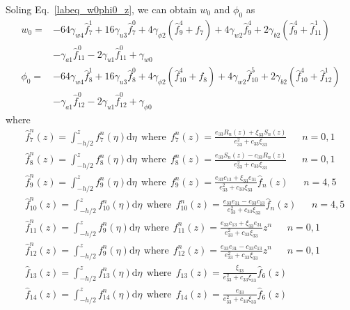 \documentclass[12pt,sort&compress,fleqn,3p]{elsarticle}
\begin{document}
Soling Eq.~\eqref{labeq_w0phi0_z}, we can obtain  $w_{0}$ and $\phi_{0}$  as
\begin{equation}\label{labeq_w0phi0}
\begin{split}
w_{0}=&-64\gamma_{w4}\hat{f}^1_{7}+16\gamma_{u3}\hat{f}^0_{7}+ 4 \gamma_{\phi 2} (\hat{f}^4_{9}+ f_7)  +4 \gamma_{w 2} \hat{f}^4_{9} +  2 \gamma_{b2}(\hat{f}^4_{9} + \hat{f}^1_{11}) \\
 &-  \gamma_{a1} \hat{f}^0_{11} - 2\gamma_{u1}\hat{f}^0_{11}   +  \gamma_{w0}  \\
\phi_{0}= & -64\gamma_{w4}\hat{f}^1_{8}+16\gamma_{u3}\hat{f}^0_{8}+4 \gamma_{\phi 2}( \hat{f}^4_{10} +f_8) +4 \gamma_{w 2} \hat{f}^5_{10} + 2 \gamma_{b2}(\hat{f}^4_{10} + \hat{f}^1_{12}) \\
&-  \gamma_{a1}\hat{f}^0_{12} - 2\gamma_{u1}\hat{f}^0_{12} +\gamma_{\phi0}
\end{split}
\end{equation}
where
\begin{equation}
\begin{split}
&\hat{f}^n_{7}(z)=\int_{-h/2}^{z} f^n_{7}(\eta) \mathrm{d}\eta     ~~\text{where}~~  f^n_{7}(z) =  \frac{e_{33}R_{n}(z)+\xi_{33}S_{n}(z)}{e_{33}^{2}+c_{33}\xi_{33}}  ~~~~~~~n=0,1  \\
&\hat{f}^n_{8}(z)=\int_{-h/2}^{z} f^n_{8}(\eta) \mathrm{d}\eta  ~~\text{where}~~  f^n_{8}(z) = \frac{e_{33}S_{n}(z)-c_{33}R_{n}(z)}{e_{33}^{2}+c_{33}\xi_{33}}  ~~~~~~~n=0,1 \\
&\hat{f}^n_{9}(z)=\int_{-h/2}^{z} f^n_{9}(\eta) \mathrm{d}\eta  ~~\text{where}~~  f^n_{9}(z)=  \frac{e_{33}c_{13} + \xi_{33}e_{31}   }{e_{33}^{2}+c_{33}\xi_{33}} \hat{f}_n(z)   ~~~~~~~n=4,5  \\
&\hat{f}^n_{10}(z)=\int_{-h/2}^{z} f^n_{10}(\eta)\mathrm{d}\eta    ~~\text{where}~~  f^n_{10}(z)=  \frac{e_{33}e_{31} -c_{33}c_{13} }{e_{33}^{2}+c_{33}\xi_{33}}\hat{f}_n(z)   ~~~~~~~n=4,5\\
&\hat{f}^n_{11}(z)=\int_{-h/2}^{z} f^n_{9}(\eta) \mathrm{d}\eta  ~~\text{where}~~ f^n_{11}(z)=\frac{e_{33}c_{13} + \xi_{33}e_{31}   }{e_{33}^{2}+c_{33}\xi_{33}} z^n  ~~~~~~~n=0,1  \\
&\hat{f}^n_{12}(z)=\int_{-h/2}^{z} f^n_{9}(\eta) \mathrm{d}\eta  ~~\text{where}~~ f^n_{12}(z)=\frac{e_{33}e_{31}  -c_{33}c_{13}   }{e_{33}^{2}+c_{33}\xi_{33}} z^n  ~~~~~~~n=0,1\\
&\hat{f}_{13}(z)=\int_{-h/2}^{z} f^n_{13}(\eta) \mathrm{d}\eta  ~~\text{where}~~ f_{13}(z)= \frac{\xi_{33}}{e_{33}^{2}+c_{33}\xi_{33}}\hat{f}_{6}(z) \\
&\hat{f}_{14}(z)=\int_{-h/2}^{z} f^n_{14}(\eta) \mathrm{d}\eta  ~~\text{where}~~ f_{14}(z)=\frac{e_{33}}{e_{33}^{2}+c_{33}\xi_{33}} \hat{f}_6(z)\\
\end{split}
\end{equation}
\end{document}
